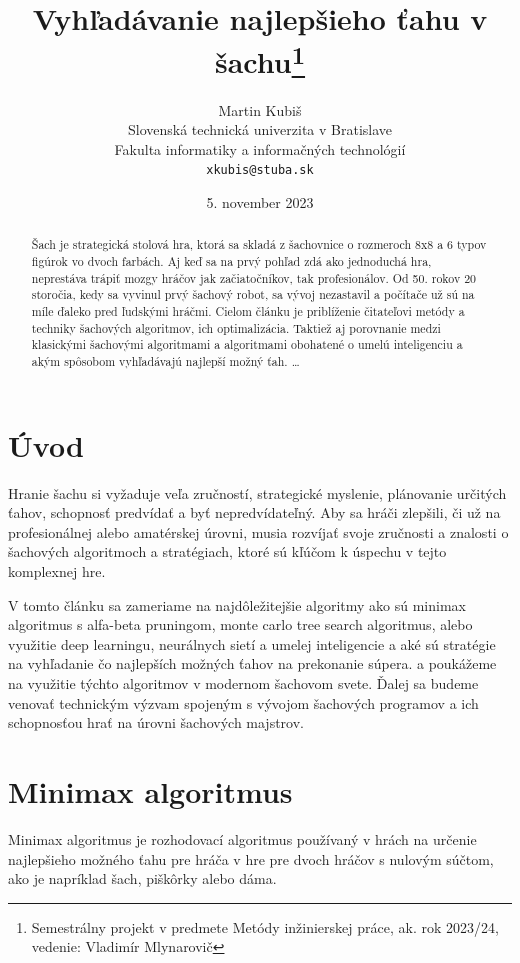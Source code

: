 \documentclass[10pt,twoside,slovak,a4paper]{article}
\title{Vyhľadávanie najlepšieho ťahu v šachu\thanks{Semestrálny projekt v predmete Metódy inžinierskej práce, ak. rok 2023/24, vedenie: Vladimír Mlynarovič}} %
\author{Martin Kubiš\\[2pt]
	{\small Slovenská technická univerzita v Bratislave}\\
	{\small Fakulta informatiky a informačných technológií}\\
	{\small \texttt{xkubis@stuba.sk}}
	}
\date{\small 5. november 2023} %
\begin{document}
\maketitle

\begin{abstract}
Šach je strategická stolová hra, ktorá sa skladá z šachovnice o rozmeroch 8x8 a 6 typov figúrok vo dvoch farbách. Aj keď sa na prvý pohľad zdá ako jednoduchá hra, neprestáva trápiť mozgy hráčov jak začiatočníkov, tak profesionálov. Od 50. rokov 20 storočia, kedy sa vyvinul prvý šachový robot, sa vývoj nezastavil a počítače už sú na míle ďaleko pred ľudskými hráčmi. Cielom článku je priblíženie čitateľovi metódy a techniky šachových algoritmov, ich optimalizácia. Taktiež aj porovnanie medzi klasickými šachovými algoritmami a algoritmami obohatené o umelú inteligenciu a akým spôsobom vyhľadávajú najlepší možný ťah.
\ldots
\end{abstract}



\section{Úvod}

Hranie šachu si vyžaduje veľa zručností, strategické myslenie, plánovanie určitých ťahov, schopnosť predvídať a  byť nepredvídateľný. Aby sa hráči zlepšili, či už na profesionálnej alebo amatérskej úrovni, musia rozvíjať svoje zručnosti a znalosti o šachových algoritmoch a stratégiach, ktoré sú kľúčom k úspechu v tejto komplexnej hre.

V tomto článku sa zameriame na najdôležitejšie algoritmy ako sú minimax algoritmus s alfa-beta pruningom, monte carlo tree search algoritmus, alebo využitie deep learningu, neurálnych sietí a umelej inteligencie a aké sú stratégie na vyhľadanie čo najlepších možných ťahov na prekonanie súpera. a poukážeme na využitie týchto algoritmov v modernom šachovom svete. Ďalej sa budeme venovať technickým výzvam spojeným s vývojom šachových programov a ich schopnosťou hrať na úrovni šachových majstrov. 


\section{Minimax algoritmus} \label{minimax}
Minimax algoritmus je rozhodovací algoritmus používaný v hrách na určenie najlepšieho možného ťahu pre hráča v hre pre dvoch hráčov s nulovým súčtom, ako je napríklad šach, piškôrky alebo dáma. 
\end{document}
